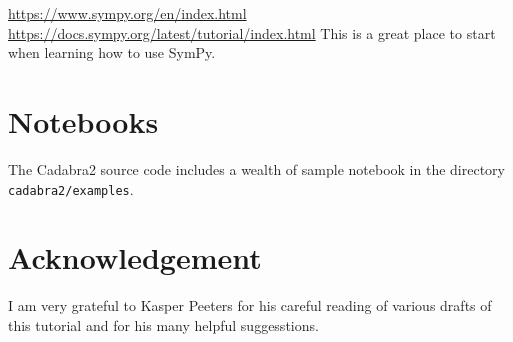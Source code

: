 \documentclass[a4paper,12pt]{article}
\numberwithin{equation}{section}%
\begin{document}
\url{https://www.sympy.org/en/index.html}\Break
\url{https://docs.sympy.org/latest/tutorial/index.html}\Break
This is a great place to start when learning how to use SymPy.

\section*{Notebooks}

The Cadabra2 source code includes a wealth of sample notebook in the directory
\verb|cadabra2/examples|.

\section*{Acknowledgement}

I am very grateful to Kasper Peeters for his careful reading of various drafts of this
tutorial and for his many helpful suggesstions.

\printbibliography  %

% 
\end{document}
